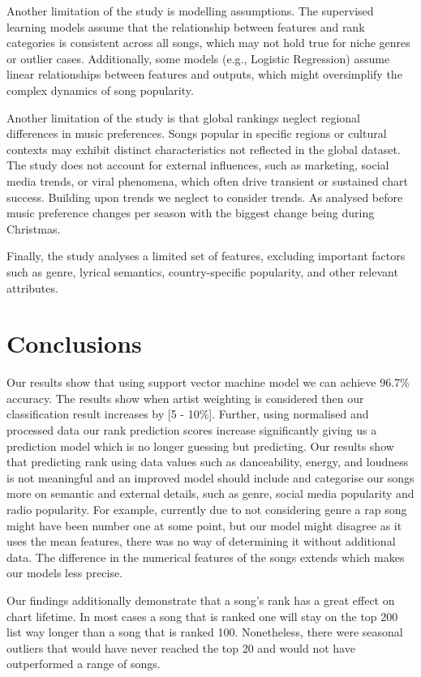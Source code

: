 \documentclass{article}
\begin{document}
Another limitation of the study is modelling assumptions. The supervised learning models assume that the relationship between features and rank categories is consistent across all songs, which may not hold true for niche genres or outlier cases. Additionally, some models (e.g., Logistic Regression) assume linear relationships between features and outputs, which might oversimplify the complex dynamics of song popularity. 

Another limitation of the study is that global rankings neglect regional differences in music preferences. Songs popular in specific regions or cultural contexts may exhibit distinct characteristics not reflected in the global dataset. The study does not account for external influences, such as marketing, social media trends, or viral phenomena, which often drive transient or sustained chart success. Building upon trends we neglect to consider trends. As analysed before music preference changes per season with the biggest change being during Christmas.  

Finally, the study analyses a limited set of features, excluding important factors such as genre, lyrical semantics, country-specific popularity, and other relevant attributes.

\section{Conclusions}

 Our results show that using support vector machine model we can achieve 96.7\% accuracy. The results show when artist weighting is considered then our classification result increases by [5 - 10\%]. Further, using normalised and processed data our rank prediction scores increase significantly giving us a prediction model which is no longer guessing but predicting. Our results show that predicting rank using data values such as danceability, energy, and loudness is not meaningful and an improved model should include and categorise our songs more on semantic and external details, such as genre, social media popularity and radio popularity. For example, currently due to not considering genre a rap song might have been number one at some point, but our model might disagree as it uses the mean features, there was no way of determining it without additional data. The difference in the numerical features of the songs extends which makes our models less precise.

Our findings additionally demonstrate that a song's rank has a great effect on chart lifetime. In most cases a song that is ranked one will stay on the top 200 list way longer than a song that is ranked 100. Nonetheless, there were seasonal outliers that would have never reached the top 20 and would not have outperformed a range of songs.
\end{document}
